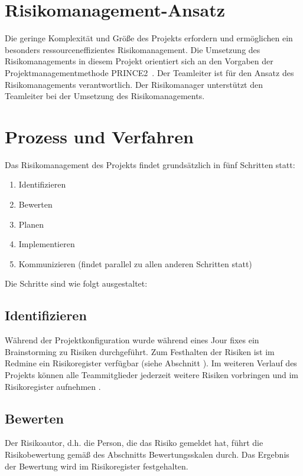 \documentclass[a4paper,11pt,listof=numbered,glossary=totoc,parskip=half,toc=bib]{scrreprt}
\begin{document}
\section{Risikomanagement-Ansatz}

Die geringe Komplexität und Größe des Projekts erfordern und ermöglichen ein besonders ressourceneffizientes Risikomanagement. Die Umsetzung des Risikomanagements in diesem Projekt orientiert sich an den Vorgaben der Projektmanagementmethode PRINCE2\textregistered\ \autocite[S. 119-136, S. 327-330]{Prince2}.
Der Teamleiter ist für den Ansatz des Risikomanagements verantwortlich. Der Risikomanager unterstützt den Teamleiter bei der Umsetzung des Risikomanagements.

\section{Prozess und Verfahren}

Das Risikomanagement des Projekts findet grundsätzlich in fünf Schritten statt:

\begin{enumerate}
	\item Identifizieren
	\item Bewerten
	\item Planen
	\item Implementieren
	\item Kommunizieren (findet parallel zu allen anderen Schritten statt)
\end{enumerate}

Die Schritte sind wie folgt ausgestaltet:

\subsection{Identifizieren}

Während der Projektkonfiguration wurde während eines Jour fixes ein Brainstorming zu Risiken durchgeführt. Zum Festhalten der Risiken ist im Redmine ein Risikoregister verfügbar (siehe Abschnitt ). Im weiteren Verlauf des Projekts können alle Teammitglieder jederzeit weitere Risiken vorbringen und im Risikoregister aufnehmen .

\subsection{Bewerten}

Der Risikoautor, d.h. die Person, die das Risiko gemeldet hat, führt die Risikobewertung gemäß des Abschnitts Bewertungsskalen durch. Das Ergebnis der Bewertung wird im Risikoregister festgehalten.
\end{document}
